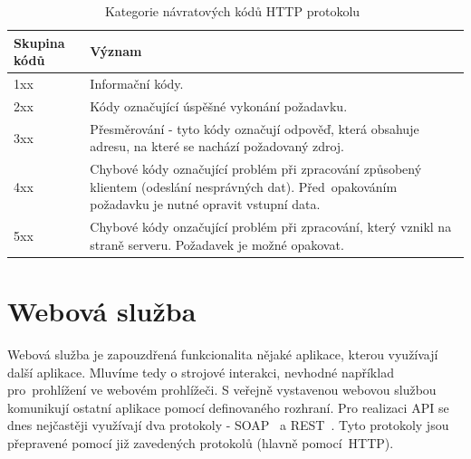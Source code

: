 \begin{table}[ht!]
  \centering
  \begin{tabular}{|l|p{9cm}|}
    \hline
    \textbf{Skupina kódů} & \textbf{Význam}\\
    \hline
    1xx & Informační kódy.\\
    \hline
    2xx & Kódy označující úspěšné vykonání požadavku.\\
    \hline
    3xx & Přesměrování - tyto kódy označují odpověď, která obsahuje adresu, na které se nachází požadovaný zdroj.\\
    \hline
    4xx & Chybové kódy označující problém při zpracování způsobený klientem (odeslání nesprávných dat). Před~opakováním požadavku je nutné opravit vstupní data.\\
    \hline
    5xx & Chybové kódy onzačující problém při zpracování, který vznikl na straně serveru. Požadavek je možné opakovat.\\
    \hline
  \end{tabular}
  \caption{Kategorie návratových kódů HTTP protokolu~\cite{rest_vse}}
  \label{tab:http_kody}
\end{table}
  
\section{Webová služba}
  
Webová služba je zapouzdřená funkcionalita nějaké aplikace, kterou využívají další aplikace.
Mluvíme tedy o strojové interakci, nevhodné například pro~prohlížení ve webovém prohlížeči.
S veřejně vystavenou webovou službou komunikují ostatní aplikace pomocí definovaného rozhraní.
Pro realizaci API se dnes nejčastěji využívají dva protokoly - SOAP~\cite{soap} a REST~\cite{rest}.
Tyto protokoly jsou přepravené pomocí již zavedených protokolů (hlavně pomocí~HTTP).